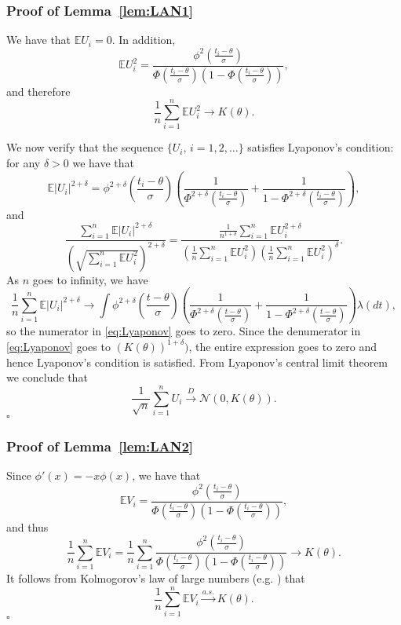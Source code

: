 \documentclass[letterpaper, conference]{IEEEtran}      %
\newcommand*{\QEDA}{\hfill\ensuremath{\square}}
\begin{document}
\subsubsection*{Proof of Lemma~\ref{lem:LAN1}} 
We have that $\mathbb E  U_i= 0$. In addition,
\[
\mathbb E U_i^2 = \frac{ \phi^2 \left( \frac{t_i-\theta}{\sigma} \right) } { \Phi \left( \frac{t_i-\theta}{\sigma} \right) \left(1- \Phi \left( \frac{t_i-\theta}{\sigma} \right) \right)},
\]
and therefore
\[
\frac{1}{n} \sum_{i=1}^n \mathbb E U_i^2 \rightarrow K(\theta).
\]

We now verify that the sequence $\{ U_i,\,i=1,2,\ldots \}$ satisfies Lyaponov's condition: for any $\delta>0$ we have that 
\[
\mathbb E \left| U_i \right|^{2+\delta} = \phi^{2+\delta} \left(\frac{t_i-\theta} {\sigma } \right)   \left( \frac{1}{\Phi^{2+\delta} \left(\frac{t_i-\theta}{\sigma }\right)} + \frac{1}{1-\Phi^{2+\delta} \left(\frac{t_i-\theta}{\sigma }\right)} \right),
\]
and
\begin{equation}
\frac{\sum_{i=1}^n \mathbb E \left| U_i \right|^{2+\delta} }{ \left( \sqrt{\sum_{i=1}^n \mathbb E U_i^2 } \right)^{2+\delta}} = 
\frac{ \frac{1}{n^{1+\delta}} \sum_{i=1}^n \mathbb E U_i^{2+\delta} }{ \left(\frac{1}{n} \sum_{i=1}^n \mathbb E U_i^2  \right) \left(\frac{1}{n} \sum_{i=1}^n \mathbb E U_i^2  \right)^\delta}. 
\label{eq:Lyaponov}
\end{equation}
As $n$ goes to infinity, we have
\[
\frac{1}{n}\sum_{i=1}^n \mathbb E \left| U_i \right|^{2+\delta}  \rightarrow  \int \phi^{2+\delta} \left(\frac{t-\theta}{\sigma }\right) \left( \frac{1}{\Phi^{2+\delta}\left(\frac{t-\theta}{\sigma }\right)} + \frac{1}{1-\Phi^{2+\delta} \left(\frac{t-\theta}{\sigma }\right)} \right) \lambda(dt),
\]
so the numerator in \eqref{eq:Lyaponov} goes to zero. Since the denumerator in \eqref{eq:Lyaponov} goes to $(K(\theta))^{1+\delta})$, the entire expression goes to zero and hence Lyaponov's condition is satisfied. From Lyaponov's central limit theorem we conclude that 
\[
\frac{1}{\sqrt{n}} \sum_{i=1}^n U_i \overset{D}{\rightarrow} \mathcal N\left(0,K(\theta) \right). 
\]
\QEDA

\subsubsection*{Proof of Lemma~\ref{lem:LAN2}} 

Since $\phi'(x) = -x \phi(x)$, we have that
\[
\mathbb E V_i =  \frac{\phi^2 \left(\frac{ t_i-\theta}{\sigma} \right) } { \Phi \left(\frac{ t_i-\theta}{\sigma} \right)  \left(1-\Phi \left(\frac{ t_i-\theta}{\sigma} \right)  \right)},
\]
and thus
\[
\frac{1}{n} \sum_{i=1}^n \mathbb E V_i =  \frac{1}{n} \sum_{i=1}^n  \frac{\phi^2\left( \frac{t_i-\theta}{\sigma} \right)} { \Phi \left( \frac{t_i - \theta}{\sigma} \right)\left(1-\Phi \left( \frac{t_i - \theta}{\sigma} \right) \right)} \rightarrow K(\theta).  
\]
It follows from Kolmogorov's law of large numbers (e.g. \cite[Thm. 10.2.3]{sen1994large}) that
\[
\frac{1}{n} \sum_{i=1}^n \mathbb E V_i \overset{a.s.}{\rightarrow} K(\theta). 
\]
\QEDA
\end{document}
